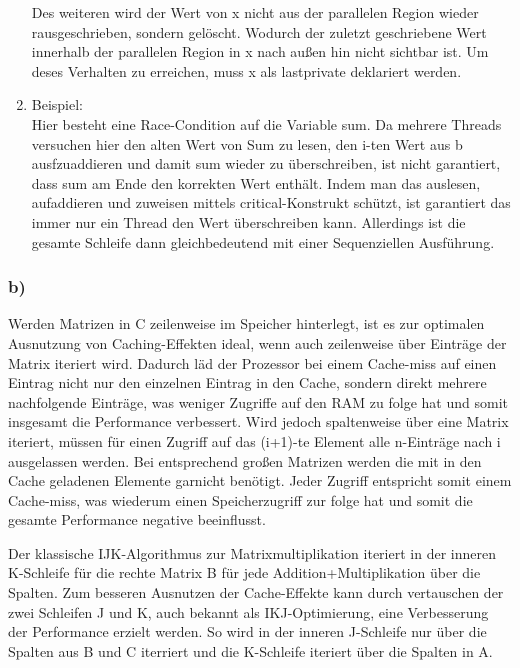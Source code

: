 \documentclass{report}
\begin{document}
\begin{enumerate}
				Des weiteren wird der Wert von x nicht aus der parallelen Region wieder rausgeschrieben, sondern gelöscht. 
				Wodurch der zuletzt geschriebene Wert innerhalb der parallelen Region in x nach außen hin nicht sichtbar ist.
				Um deses Verhalten zu erreichen, muss x als lastprivate deklariert werden.
			\item Beispiel: \\
				Hier besteht eine Race-Condition auf die Variable sum. 
				Da mehrere Threads versuchen hier den alten Wert von Sum zu lesen, den i-ten Wert aus b ausfzuaddieren und damit sum wieder zu überschreiben, ist nicht garantiert, dass sum am Ende den korrekten Wert enthält.
				Indem man das auslesen, aufaddieren und zuweisen mittels critical-Konstrukt schützt, ist garantiert das immer nur ein Thread den Wert überschreiben kann.
				Allerdings ist die gesamte Schleife dann gleichbedeutend mit einer Sequenziellen Ausführung.
		\end{enumerate}

		\subsubsection{b)}
			Werden Matrizen in C zeilenweise im Speicher hinterlegt, ist es zur optimalen Ausnutzung von Caching-Effekten ideal, wenn auch zeilenweise über Einträge der Matrix iteriert wird.
			Dadurch läd der Prozessor bei einem Cache-miss auf einen Eintrag nicht nur den einzelnen Eintrag in den Cache, sondern direkt mehrere nachfolgende Einträge, was weniger Zugriffe auf den RAM zu folge hat und somit insgesamt die Performance verbessert.
			Wird jedoch spaltenweise über eine Matrix iteriert, müssen für einen Zugriff auf das (i+1)-te Element alle n-Einträge nach i ausgelassen werden. 
			Bei entsprechend großen Matrizen werden die mit in den Cache geladenen Elemente garnicht benötigt.
			Jeder Zugriff entspricht somit einem Cache-miss, was wiederum einen Speicherzugriff zur folge hat und somit die gesamte Performance negative beeinflusst.
			
			Der klassische IJK-Algorithmus zur Matrixmultiplikation iteriert in der inneren K-Schleife für die rechte Matrix B für jede Addition+Multiplikation über die Spalten.
			Zum besseren Ausnutzen der Cache-Effekte kann durch vertauschen der zwei Schleifen J und K, auch bekannt als IKJ-Optimierung, eine Verbesserung der Performance erzielt werden.
			So wird in der inneren J-Schleife nur über die Spalten aus B und C iterriert und die K-Schleife iteriert über die Spalten in A.
\end{document}
